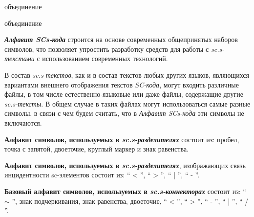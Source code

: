 \begin{SCn}
	\begin{scnreltoset}{объединение}
			\begin{scnreltoset}{объединение}
			\end{scnreltoset}
	\end{scnreltoset}
\end{SCn} 

\textbf{\textit{Алфавит SCs-кода\scnsupergroupsign}} строится на основе современных общепринятых наборов символов, что позволяет упростить разработку средств для работы с \textit{sc.s-текстами} с использованием современных технологий.

В состав \textit{sc.s-текстов}, как и в состав текстов любых других языков, являющихся вариантами внешнего отображения текстов \textit{SC-кода}, могут входить различные файлы, в том числе естественно-языковые или даже файлы, содержащие другие \textit{sc.s-тексты}. В общем случае в таких файлах могут использоваться самые разные символы, в связи с чем будем считать, что в \textit{Алфавит SCs-кода\scnsupergroupsign} эти символы не включаются.

\textbf{Алфавит символов, используемых в \textit{sc.s-разделителях}\scnsupergroupsign} состоит из: пробел, точка с запятой, двоеточие, круглый маркер и знак равенства.

\textbf{Алфавит символов, используемых в \textit{sc.s-разделителях}\scnsupergroupsign}, изображающих связь инцидентности sc-элементов состоит из: `` < ''{}, `` > ''{}, `` | ''{}, `` - ''{}.

\textbf{Базовый алфавит символов, используемых в \textit{sc.s-коннекторах}\scnsupergroupsign} состоит из: `` $\sim$ ''{}, знак подчеркивания, знак равенства, двоеточие, `` < ''{}, `` > ''{}, `` - ''{}, `` | ''{}, `` / ''{}.
	
